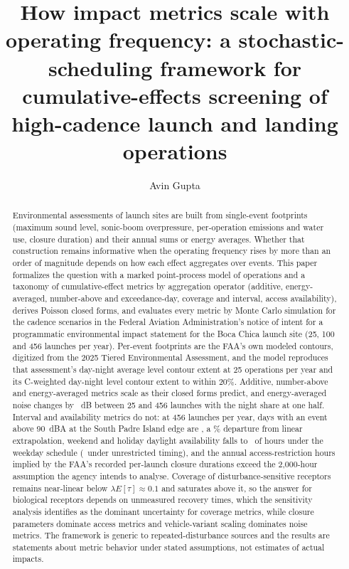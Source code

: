 \documentclass[preprint,12pt,authoryear]{elsarticle}
\begin{document}
\begin{frontmatter}

\title{How impact metrics scale with operating frequency: a stochastic-scheduling framework for cumulative-effects screening of high-cadence launch and landing operations}

\author{Avin Gupta}
\address{Independent researcher}

\begin{abstract}
Environmental assessments of launch sites are built from single-event footprints (maximum sound level, sonic-boom overpressure, per-operation emissions and water use, closure duration) and their annual sums or energy averages. Whether that construction remains informative when the operating frequency rises by more than an order of magnitude depends on how each effect aggregates over events. This paper formalizes the question with a marked point-process model of operations and a taxonomy of cumulative-effect metrics by aggregation operator (additive, energy-averaged, number-above and exceedance-day, coverage and interval, access availability), derives Poisson closed forms, and evaluates every metric by Monte Carlo simulation for the cadence scenarios in the Federal Aviation Administration's notice of intent for a programmatic environmental impact statement for the Boca Chica launch site (25, 100 and 456 launches per year). Per-event footprints are the FAA's own modeled contours, digitized from the 2025 Tiered Environmental Assessment, and the model reproduces that assessment's day-night average level contour extent at 25 operations per year and its C-weighted day-night level contour extent to within 20\%. Additive, number-above and energy-averaged metrics scale as their closed forms predict, and energy-averaged noise changes by \valCfTotalTwoFiveFourFiveSixDb~dB between 25 and 456 launches with the night share at one half. Interval and availability metrics do not: at 456 launches per year, days with an event above 90~dBA at the South Padre Island edge are \valEOneSimDaysNineZeroSouthPadreIslandNearestEdge, a \valEOneRelerrPctDaysNineZeroSouthPadreIslandNearestEdge\% departure from linear extrapolation, weekend and holiday daylight availability falls to \valPhaseTwoWeekendAvail~of hours under the weekday schedule (\valEOneNFourFiveSixWeekendAvail~under unrestricted timing), and the annual access-restriction hours implied by the FAA's recorded per-launch closure durations exceed the 2,000-hour assumption the agency intends to analyse. Coverage of disturbance-sensitive receptors remains near-linear below $\lambda E[\tau]\approx 0.1$ and saturates above it, so the answer for biological receptors depends on unmeasured recovery times, which the sensitivity analysis identifies as the dominant uncertainty for coverage metrics, while closure parameters dominate access metrics and vehicle-variant scaling dominates noise metrics. The framework is generic to repeated-disturbance sources and the results are statements about metric behavior under stated assumptions, not estimates of actual impacts.
\end{abstract}


\end{frontmatter}
\end{document}
